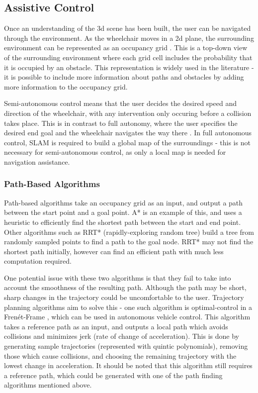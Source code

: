 \documentclass[12pt]{article}
\begin{document}

\pagebreak
\subsection{Assistive Control}
Once an understanding of the 3d scene has been built, the user can be navigated through the environment.
As the wheelchair moves in a 2d plane, the surrounding environment can be represented as an occupancy grid \cite{elfesUsingOccupancyGrids1989}.
This is a top-down view of the surrounding environment where each grid cell includes the probability that it is occupied
by an obstacle. This representation is widely used in the literature - it is possible to include more information about
paths and obstacles by adding more information to the occupancy grid.

Semi-autonomous control means that the user decides the desired speed and direction of the wheelchair, with any intervention only
occuring before a collision takes place. This is in contrast to full autonomy, where the user specifies the
desired end goal and the wheelchair navigates the way there \cite{wangS2P2SelfSupervisedGoalDirected2021}.
In full autonomous control, SLAM is required to build a global map of the surroundings - this is not necessary
for semi-autonomous control, as only a local map is needed for navigation assistance.

\subsubsection{Path-Based Algorithms}
Path-based algorithms take an occupancy grid as an input, and output a path between the start point and a goal point.
A* is an example of this, and uses a heuristic to efficiently find the shortest path between the start and end point.
Other algorithms such as RRT* \cite{karamanSamplingbasedAlgorithmsOptimal2011} (rapidly-exploring random tree) build a tree from randomly sampled points
to find a path to the goal node. RRT* may not find the shortest path initially, however can find an efficient path with much less
computation required.

One potential issue with these two algorithms is that they fail to take into account the smoothness of the resulting path.
Although the path may be short, sharp changes in the trajectory could be uncomfortable to the user.
Trajectory planning algorithms aim to solve this - one such algorithm is optimal-control in a Fren\'et-Frame \cite{werlingOptimalTrajectoryGeneration2010},
which can be used in autonomous vehicle control.
This algorithm takes a reference path as an input, and outputs a local path which avoids collisions and minimizes jerk (rate of change of acceleration).
This is done by generating sample trajectories (represented with quintic polynomials), removing those which cause collisions, and choosing
the remaining trajectory with the lowest change in acceleration. It should be noted that this algorithm still requires a reference path, which could be generated
with one of the path finding algorithms mentioned above.
\end{document}
